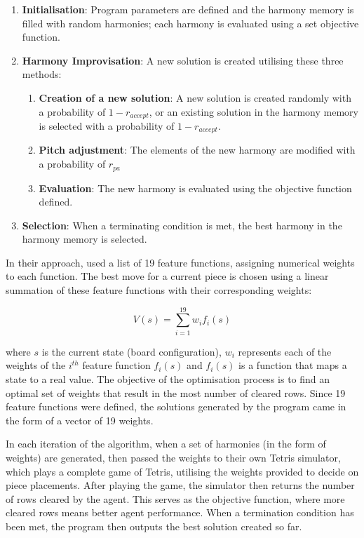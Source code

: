 \documentclass[a4paper, 12pt]{extreport}
\begin{document}
					\begin{enumerate}
						\item \textbf{Initialisation}: Program parameters are defined and the harmony memory is filled with random harmonies; each harmony is evaluated using a set objective function.
						\item \textbf{Harmony Improvisation}: A new solution is created utilising these three methods:
						\begin{enumerate}
							\item \textbf{Creation of a new solution}: A new solution is created randomly with a probability of $1 - r_{accept}$, or an existing solution in the harmony memory is selected with a probability of $1 - r_{accept}$.
							\item \textbf{Pitch adjustment}: The elements of the new harmony are modified with a probability of $r_{pa}$
							\item \textbf{Evaluation}: The new harmony is evaluated using the objective function defined.
						\end{enumerate}
						\item \textbf{Selection}: When a terminating condition is met, the best harmony in the harmony memory is selected.
					\end{enumerate}
					
					In their approach, \citeauthor{tetris-harmony-search} \cite{tetris-harmony-search} used a list of 19 feature functions, assigning numerical weights to each function. The best move for a current piece is chosen using a linear summation of these feature functions with their corresponding weights:
					
					\begin{equation}
						V(s) = \sum_{i=1}^{19}w_{i}f_{i}(s)
					\end{equation}
					
					\noindent where $s$ is the current state (board configuration), $w_i$ represents each of the weights of the $i^{th}$ feature function $f_i(s)$ and $f_i(s)$ is a function that maps a state to a real value. The objective of the optimisation process is to find an optimal set of weights that result in the most number of cleared rows. Since 19 feature functions were defined, the solutions generated by the program came in the form of a vector of 19 weights.
					
					In each iteration of the algorithm, when a set of harmonies (in the form of weights) are generated, \citeauthor{tetris-harmony-search} \cite{tetris-harmony-search} then passed the weights to their own Tetris simulator, which plays a complete game of Tetris, utilising the weights provided to decide on piece placements. After playing the game, the simulator then returns the number of rows cleared by the agent. This serves as the objective function, where more cleared rows means better agent performance. When a termination condition has been met, the program then outputs the best solution created so far.
					
\end{document}
